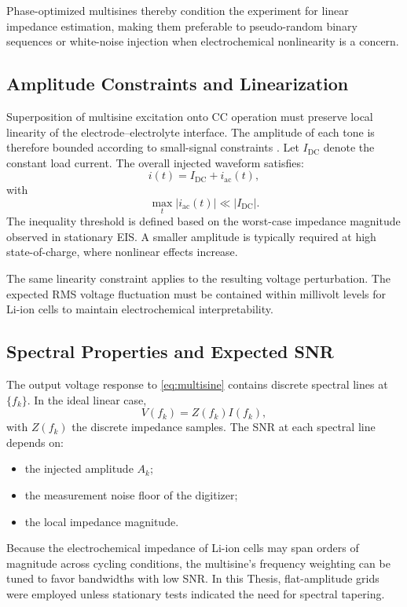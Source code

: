 Phase-optimized multisines thereby condition the experiment for linear impedance estimation, making them preferable to pseudo-random binary sequences or white-noise injection when electrochemical nonlinearity is a concern.

\subsection{Amplitude Constraints and Linearization}

Superposition of multisine excitation onto CC operation must preserve local linearity of the electrode–electrolyte interface. The amplitude of each tone is therefore bounded according to small-signal constraints \cite{}. Let $I_{\mathrm{DC}}$ denote the constant load current. The overall injected waveform satisfies:
\begin{equation}
    i(t) = I_{\mathrm{DC}} + i_{\mathrm{ac}}(t),
\end{equation}
with
\begin{equation}
    \max_t |i_{\mathrm{ac}}(t)| \ll |I_{\mathrm{DC}}|.
\end{equation}
The inequality threshold is defined based on the worst-case impedance magnitude observed in stationary EIS. A smaller amplitude is typically required at high state-of-charge, where nonlinear effects increase.

The same linearity constraint applies to the resulting voltage perturbation. The expected RMS voltage fluctuation must be contained within millivolt levels for Li-ion cells to maintain electrochemical interpretability.

\subsection{Spectral Properties and Expected SNR}

The output voltage response to \eqref{eq:multisine} contains discrete spectral lines at $\{f_k\}$. In the ideal linear case,
\begin{equation}
    V(f_k) = Z(f_k) I(f_k),
\end{equation}
with $Z(f_k)$ the discrete impedance samples. The SNR at each spectral line depends on:
\begin{itemize}
    \item the injected amplitude $A_k$;
    \item the measurement noise floor of the digitizer;
    \item the local impedance magnitude.
\end{itemize}
Because the electrochemical impedance of Li-ion cells may span orders of magnitude across cycling conditions, the multisine’s frequency weighting can be tuned to favor bandwidths with low SNR. In this Thesis, flat-amplitude grids were employed unless stationary tests indicated the need for spectral tapering.

